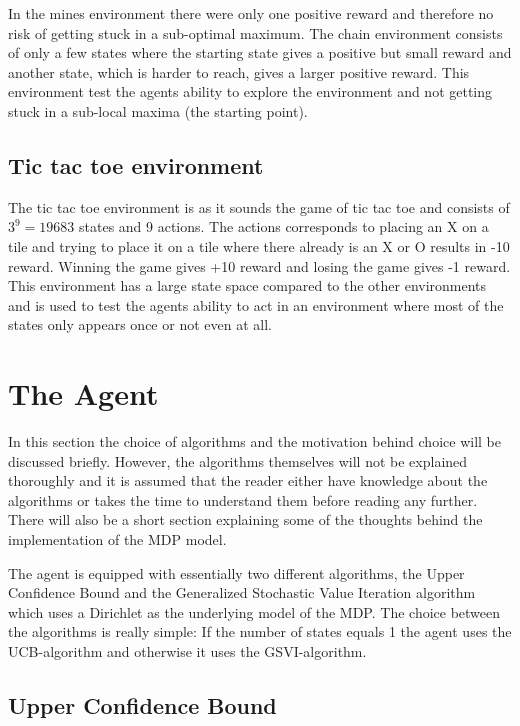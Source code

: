 \documentclass[11pt]{article}
\numberwithin{equation}{section}
\begin{document}
\begin{flushleft}
In the mines environment there were only one positive reward and therefore no risk of getting stuck in a sub-optimal maximum. The chain environment consists of only a few states where the starting state gives a positive but small reward and another state, which is harder to reach, gives a larger positive reward. This environment test the agents ability to explore the environment and not getting stuck in a sub-local maxima (the starting point).

\subsection{Tic tac toe environment}

The tic tac toe environment is as it sounds the game of tic tac toe and consists of $3^9=19683$ states and 9 actions. The actions corresponds to placing an X on a tile and trying to place it on a tile where there already is an X or O results in -10 reward. Winning the game gives +10 reward and losing the game gives -1 reward. This environment has a large state space compared to the other environments and is used to test the agents ability to act in an environment where most of the states only appears once or not even at all.

\section{The Agent}

In this section the choice of algorithms and the motivation behind choice will be discussed briefly. However, the algorithms themselves will not be explained thoroughly and it is assumed that the reader either have knowledge about the algorithms or takes the time to understand them before reading any further. There will also be a short section explaining some of the thoughts behind the implementation of the MDP model. \newline

The agent is equipped with essentially two different algorithms, the Upper Confidence Bound and the Generalized Stochastic Value Iteration algorithm which uses a Dirichlet as the underlying model of the MDP. The choice between the algorithms is really simple: If the number of states equals 1 the agent uses the UCB-algorithm and otherwise it uses the GSVI-algorithm.

\subsection{Upper Confidence Bound}


\end{flushleft}
\end{document}
